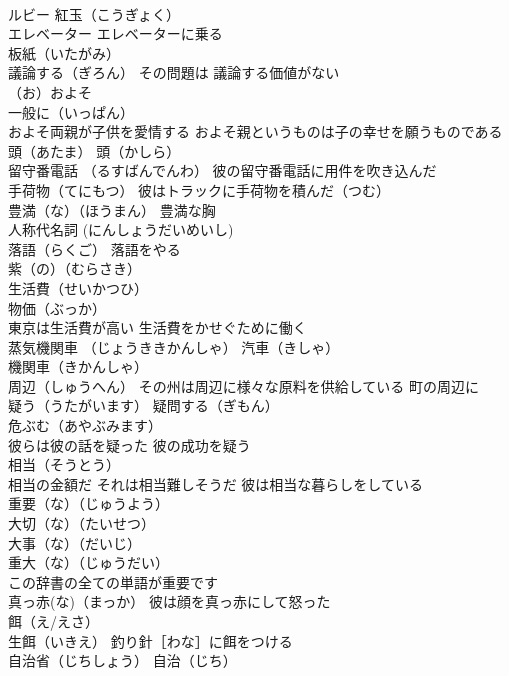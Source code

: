 \documentclass[8pt]{extreport}
\begin{document}
\begin{CJK}{UTF8}{min}
\\	ルビー 紅玉（こうぎょく）
\\	エレベーター エレベーターに乗る
\\	板紙（いたがみ）
\\	議論する（ぎろん） その問題は 議論する価値がない
\\	（お）およそ 
\\	一般に（いっぱん）
\\	およそ両親が子供を愛情する およそ親というものは子の幸せを願うものである
\\	頭（あたま） 頭（かしら）
\\	留守番電話 （るすばんでんわ） 彼の留守番電話に用件を吹き込んだ
\\	手荷物（てにもつ） 彼はトラックに手荷物を積んだ（つむ）
\\	豊満（な）（ほうまん） 豊満な胸
\\	人称代名詞 (にんしょうだいめいし)
\\	落語（らくご） 落語をやる
\\	紫（の）（むらさき）
\\	生活費（せいかつひ）
\\	物価（ぶっか）
\\	東京は生活費が高い 生活費をかせぐために働く
\\	蒸気機関車 （じょうききかんしゃ） 汽車（きしゃ） 
\\	機関車（きかんしゃ）
\\	周辺（しゅうへん） その州は周辺に様々な原料を供給している 町の周辺に
\\	疑う（うたがいます） 疑問する（ぎもん）
\\	危ぶむ（あやぶみます）
\\	彼らは彼の話を疑った 彼の成功を疑う
\\	相当（そうとう） 
\\	相当の金額だ それは相当難しそうだ 彼は相当な暮らしをしている
\\	重要（な）（じゅうよう） 
\\	大切（な）（たいせつ） 
\\	大事（な）（だいじ） 
\\	重大（な）（じゅうだい）
\\	この辞書の全ての単語が重要です
\\	真っ赤(な)（まっか） 彼は顔を真っ赤にして怒った
\\	餌（え/えさ） 
\\	生餌（いきえ） 釣り針［わな］に餌をつける
\\	自治省（じちしょう） 自治（じち）

\end{CJK}
\end{document}
